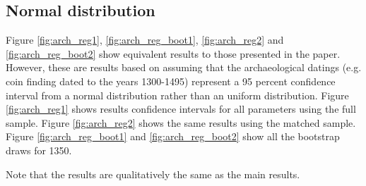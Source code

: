 \FloatBarrier
\subsection{Normal distribution}
Figure \ref{fig:arch_reg1}, \ref{fig:arch_reg_boot1}, \ref{fig:arch_reg2} and \ref{fig:arch_reg_boot2} show equivalent results to those presented in the paper. However, these are results based on assuming that the archaeological datings (e.g. coin finding dated to the years 1300-1495) represent a 95 percent confidence interval from a normal distribution rather than an uniform distribution. Figure \ref{fig:arch_reg1} shows results confidence intervals for all parameters using the full sample. Figure \ref{fig:arch_reg2} shows the same results using the matched sample. Figure \ref{fig:arch_reg_boot1} and \ref{fig:arch_reg_boot2} show all the bootstrap draws for 1350.

Note that the results are qualitatively the same as the main results. 


